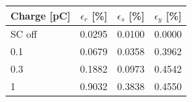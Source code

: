 \begin{tabular}{lrrr}
\toprule
Charge [pC] & $\epsilon_r$ [\%] & $\epsilon_s$ [\%] & $\epsilon_y$ [\%] \\
\midrule
SC off & 0.0295 & 0.0100 & 0.0000 \\
0.1 & 0.0679 & 0.0358 & 0.3962 \\
0.3 & 0.1882 & 0.0973 & 0.4542 \\
1 & 0.9032 & 0.3838 & 0.4550 \\
\bottomrule
\end{tabular}
